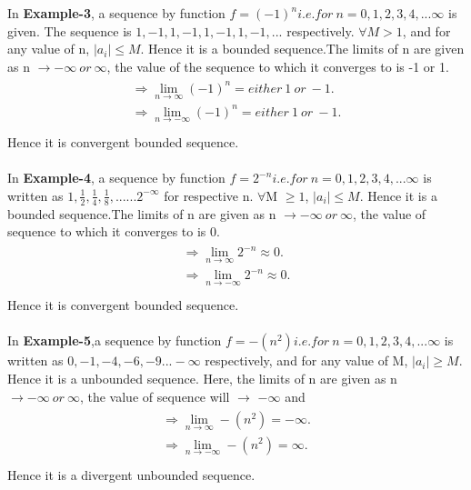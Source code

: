 \documentclass[a4paper]{article}
\begin{document}
In \textbf{Example-3}, a sequence by function $f=(-1)^n i.e. for\ n=0, 1 ,2,3,4,...\infty$ is given. The sequence is $1,-1,1,-1,1,-1,1,-1,...$ respectively. $\forall M > 1$, and for any value of n, $\mid a_i \mid \leq M $. Hence it is a bounded sequence.The limits of n are given as n $\to -\infty\ or\ \infty$, the value of the sequence to which it converges to is -1 or 1. 
\begin{align}
\begin{split}
\Rightarrow \lim_{n \to \infty} (-1)^n = either \  1 \ or\ -1.\\
\Rightarrow \lim_{n \to -\infty} (-1)^n = either \  1 \ or\ -1.
\\
\end{split}
\end{align}
Hence it is convergent bounded sequence.
\\
\\
In \textbf{Example-4}, a sequence by function $f=2^{-n} i.e. for\ n=0, 1 ,2,3,4,...\infty$ is written as $1,\frac{1}{2},\frac{1}{4},\frac{1}{8},......2^{-\infty}$ for respective n. $\forall$M $\geq 1$, $\mid a_i \mid \leq M $. Hence it is a bounded sequence.The limits of n are given as n $\to -\infty\ or\ \infty$, the value of sequence to which it converges to is 0. 
\begin{align}
\begin{split}
\Rightarrow \lim_{n \to \infty} 2^{-n} \approx 0.\\
\Rightarrow \lim_{n \to -\infty} 2^{-n} \approx 0.
\\
\end{split}
\end{align}
Hence it is convergent bounded sequence.
\\
\\
In \textbf{Example-5},a sequence by function $f=-(n^2) i.e. for\ n=0, 1 ,2,3,4,...\infty$ is written as $0,-1,-4,-6,-9...-\infty$ respectively, and for any value of M, $\mid a_i \mid \geq M $. Hence it is a unbounded sequence. Here, the limits of n are given as n $\to -\infty\ or\ \infty$, the value of sequence will $\to$ $-\infty$ and
\begin{align}
\begin{split}
\Rightarrow \lim_{n \to \infty} -(n^2) = -\infty.\\
\Rightarrow \lim_{n \to -\infty} -(n^2) = \infty.
\\
\end{split}
\end{align}
Hence it is a divergent unbounded sequence.
\end{document}
